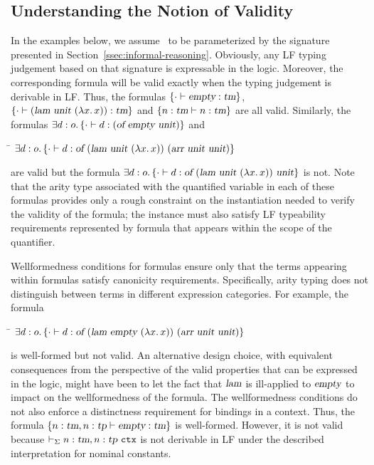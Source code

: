 \subsection{Understanding the Notion of Validity}\label{ssec:logic-examples}

In the examples below, we assume \logic\ to be parameterized by the
signature presented in Section~\ref{ssec:informal-reasoning}.
%
Obviously, any LF typing judgement based on that signature is expressable
in the logic.
%
Moreover, the corresponding formula will be valid exactly when the
typing judgement is derivable in LF.
%
Thus, the formulas
$\left\{\cdot \vdash \mbox{\sl empty} : \mbox{\sl tm}\right\}$,
$\left\{\cdot \vdash (\mbox{\sl lam}\  \mbox{\sl unit}\  (\lambda {x}.{\mkern 3mu} x)) : \mbox{\sl tm}\right\}$ and
$\left\{n : \mbox{\sl tm} \vdash n:\mbox{\sl tm}\right\}$ are all valid. 
Similarly, the formulas
$\exists d:o. \left\{\cdot \vdash d : (\mbox{\sl of} \  \mbox{\sl empty}\ 
    \mbox{\sl unit})\right\}$ and
\begin{tabbing}
\qquad\=\kill
\>$\exists d:o. \left\{\cdot \vdash d :\mbox{\sl of} \  (\mbox{\sl lam} \  \mbox{\sl unit}\ 
    (\lambda {x}.{\mkern 3mu} x))\  (\mbox{\sl arr}\  \mbox{\sl unit}\  \mbox{\sl unit})\right\}$
\end{tabbing}
are valid but the formula
$\exists d:o. \left\{\cdot \vdash d:\mbox{\sl of} \ 
    (\mbox{\sl lam} \  \mbox{\sl unit}\  (\lambda {x}.{\mkern 3mu} x))\  \mbox{\sl unit}\right\}$
is not.
%
Note that the arity type associated with the quantified variable in
each of these formulas provides only a rough constraint on the
instantiation needed to verify the validity of the formula; 
the instance must also satisfy LF typeability requirements
represented by formula that appears within the scope of the
quantifier.

Wellformedness conditions for formulas ensure only that the terms
appearing within formulas satisfy canonicity requirements.
%
Specifically, arity typing does not distinguish between terms in
different expression categories.
%
For example, the formula
\begin{tabbing}
\qquad\=\kill
\> $\exists d:o. \left\{\cdot \vdash d:\mbox{\sl of} \  (\mbox{\sl lam} \  \mbox{\sl empty} \ 
    (\lambda {x}.{\mkern 3mu} x))\  (\mbox{\sl arr}\  \mbox{\sl unit}\  \mbox{\sl unit})\right\}$
\end{tabbing}
is well-formed but not valid.
%
An alternative design choice, with equivalent consequences from the
perspective of the valid properties that can be expressed in the
logic, might have been to let the fact that $\mbox{\sl lam}$ is ill-applied to
$\mbox{\sl empty}$ to impact on the wellformedness of the formula.
%
The wellformedness conditions do not also enforce a distinctness
requirement for bindings in a context.
%
Thus, the formula $\left\{n : \mbox{\sl tm}, n : \mbox{\sl tp} \vdash \mbox{\sl empty} : \mbox{\sl tm}\right\}$ is
well-formed.
%
However, it is not valid because $\vdash_{\Sigma} n : \mbox{\sl tm}, n : \mbox{\sl tp}\ \mbox{\tt ctx}$ is not
derivable in LF under the described interpretation for nominal
constants.
%

